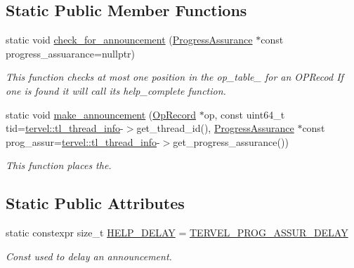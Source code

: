 \subsection*{Static Public Member Functions}
\begin{DoxyCompactItemize}
\item 
static void \hyperlink{classtervel_1_1util_1_1_progress_assurance_ada9868a602d3f45d1c041a29a7612138}{check\+\_\+for\+\_\+announcement} (\hyperlink{classtervel_1_1util_1_1_progress_assurance}{Progress\+Assurance} $\ast$const progress\+\_\+assuarance=nullptr)
\begin{DoxyCompactList}\small\item\em This function checks at most one position in the op\+\_\+table\+\_\+ for an O\+P\+Recod If one is found it will call its help\+\_\+complete function. \end{DoxyCompactList}\item 
static void \hyperlink{classtervel_1_1util_1_1_progress_assurance_aa07f6bcc8e41c4c63066989f1ff90685}{make\+\_\+announcement} (\hyperlink{classtervel_1_1util_1_1_op_record}{Op\+Record} $\ast$op, const uint64\+\_\+t tid=\hyperlink{namespacetervel_a60b23602adbb2dee6160af411b74bfd3}{tervel\+::tl\+\_\+thread\+\_\+info}-\/$>$get\+\_\+thread\+\_\+id(), \hyperlink{classtervel_1_1util_1_1_progress_assurance}{Progress\+Assurance} $\ast$const prog\+\_\+assur=\hyperlink{namespacetervel_a60b23602adbb2dee6160af411b74bfd3}{tervel\+::tl\+\_\+thread\+\_\+info}-\/$>$get\+\_\+progress\+\_\+assurance())
\begin{DoxyCompactList}\small\item\em This function places the. \end{DoxyCompactList}\end{DoxyCompactItemize}
\subsection*{Static Public Attributes}
\begin{DoxyCompactItemize}
\item 
static constexpr size\+\_\+t \hyperlink{classtervel_1_1util_1_1_progress_assurance_a7b1a1448c14b614503aff9312593c9bc}{H\+E\+L\+P\+\_\+\+D\+E\+L\+A\+Y} = \hyperlink{util_8h_a5200ffa9857ce73ef77b3e8581d5b0cc}{T\+E\+R\+V\+E\+L\+\_\+\+P\+R\+O\+G\+\_\+\+A\+S\+S\+U\+R\+\_\+\+D\+E\+L\+A\+Y}
\begin{DoxyCompactList}\small\item\em Const used to delay an announcement. \end{DoxyCompactList}\end{DoxyCompactItemize}
